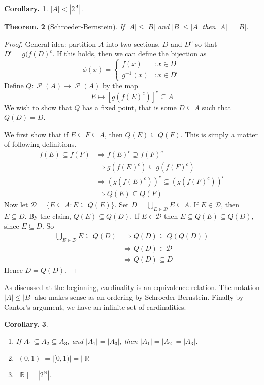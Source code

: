 \documentclass[11pt, a4paper]{memoir}
\DeclareMathOperator{\N}{{\mathbb{N}}}
\DeclareMathOperator{\R}{{\mathbb{R}}}
\theoremstyle{change}
\newtheorem{theorem}{Theorem.}[section]
\newtheorem{corollary}[theorem]{Corollary.}
\theoremstyle{plain}
\theoremstyle{nonumberplain}
\newtheorem{proof}{Proof}
\DeclareMathOperator{\Ps}{\mathcal{P}}
\numberwithin{equation}{section}
\begin{document}
\begin{corollary}
    $|A|<|2^A|$.
\end{corollary}
\begin{theorem}[Schroeder-Bernstein]
    If $|A|\leq|B|$ and $|B|\leq|A|$ then $|A|=|B|$.
\end{theorem}
\begin{proof}
    General idea: partition $A$ into two sections, $D$ and $D^c$ so that $D^c=g(f(D)^c$. If this holds, then we can define
    the bijection as
    \[\phi(x)=
    \begin{cases}
        f(x)&:x\in D\\
        g^{-1}(x)&:x\in D^c
    \end{cases}
    \]
    Define $Q:\Ps(A)\to\Ps(A)$ by the map
    \[E\mapsto\left[g(f(E)^c)\right]^c\subseteq A\]
    We wish to show that $Q$ has a fixed point, that is some $D\subseteq A$ such that $Q(D)=D$.

    We first show that if $E\subseteq F\subseteq A$, then $Q(E)\subseteq Q(F)$. This is simply a matter of following
    definitions.
    \begin{align*}
        f(E)\subseteq f(F)&\Rightarrow f(E)^c\supseteq f(F)^c\\
        &\Rightarrow g(f(E)^c)\subseteq g(f(F)^c)\\
        &\Rightarrow (g(f(E)^c))^c\subseteq (g(f(F)^c))^c\\
        &\Rightarrow Q(E)\subseteq Q(F)
    \end{align*}
    Now let $\mathcal{D}=\{E\subseteq A:E\subseteq Q(E)\}$. Set $D=\bigcup_{E\in\mathcal{D}}E\subseteq A$. If
    $E\in\mathcal{D}$, then $E\subseteq D$. By the claim, $Q(E)\subseteq Q(D)$. If $E\in\mathcal{D}$ then
    $E\subseteq Q(E)\subseteq Q(D)$, since $E\subseteq D$. So
    \begin{align*}
        \bigcup_{E\in\mathcal{D}}E\subseteq Q(D) &\Rightarrow Q(D)\subseteq Q(Q(D))\\
        &\Rightarrow Q(D)\in\mathcal{D}\\
        &\Rightarrow Q(D)\subseteq D
    \end{align*}
    Hence $D=Q(D)$.

\end{proof}
As discussed at the beginning, cardinality is an equivalence relation. The notation $|A|\leq|B|$ also makes sense as an
ordering by Schroeder-Bernstein. Finally by Cantor's argument, we have an infinite set of cardinalities.
\begin{corollary}\hspace{1cm}
    \begin{enumerate}
        \item If $A_1\subseteq A_2\subseteq A_3$, and $|A_1|=|A_3|$, then $|A_1|=|A_2|=|A_3|$.
        \item $|(0,1)|=|[0,1)|=|\R|$
        \item $|\R|=|2^{\N}|$.
    \end{enumerate}
\end{corollary}
\end{document}
